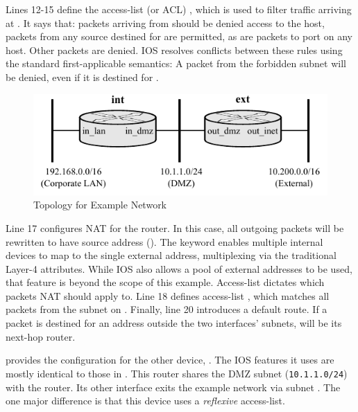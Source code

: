 Lines 12-15 define the access-list (or ACL) , which is used to filter traffic
arriving at . It says that:  packets arriving from 
should be denied access to the  host, 
packets from any source destined for  are permitted, as are
 packets to port  on any host. Other packets are denied. IOS
resolves conflicts between these rules using the standard first-applicable
semantics: A packet from the forbidden subnet will be denied, even if it is
destined for .

\begin{figure}
  \centering
  \includegraphics[scale=0.95]{figs/orig_network.pdf}
  \caption{Topology for Example Network}
  \label{fig:orig-network}
\end{figure}

Line 17 configures NAT for the router. In this case, all outgoing packets will
be rewritten to have source address  ().
The  keyword enables multiple internal devices to map to the single
external address, multiplexing via the traditional Layer-4 attributes. While IOS also
allows a pool of external addresses to be used, that feature is beyond the
scope of this example. Access-list  dictates which packets NAT should
apply to. Line 18 defines access-list , which matches all packets from
the subnet on . Finally, line 20 introduces a default route.
If a packet is destined for an address outside the two interfaces'
subnets,  will be its next-hop router.

 provides the configuration for the
other device, . The IOS features it uses are mostly identical
to those in . This router
shares the DMZ subnet ({\small\verb$10.1.1.0/24$}) with the
 router. Its other interface exits the example network via subnet
. The one major difference is that this device uses
a \emph{reflexive} access-list.

